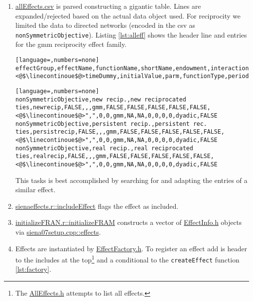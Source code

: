 \documentclass{tufte-handout}
\makeatletter
\newenvironment{listing*}[1][htbp]%
  {\ifvmode\else\unskip\fi\begin{@tufte@float}[#1]{lstlisting}{star}}
  {\end{@tufte@float}}
\def\linkstyle{} %
\newcommand\sourcelinkpF[2]{\href{../#1/#2}{\linkstyle{#2}}}
\newcommand\sourcelinkpFF[3]{\href{../#1/#2}{\linkstyle{#2::}{#3}}}
\makeatother
\begin{document}
\def\linecontinoue{\textcolor{red}{\ensuremath{\hookrightarrow}}}
\begin{enumerate}
\item \sourcelinkpF{data}{allEffects.csv} is parsed constructing a gigantic table.
Lines are expanded/rejected based on the actual data object used.
For reciprocity we limited the data to directed networks (encoded in the csv as \texttt{nonSymmetricObjective}).
Listing \ref{lst:alleff} shows the header line and entries for the gmm reciprocity effect family.
\begin{listing*}
\label{lst:alleff}
\caption{
  \texttt{allEffects.csv}: Each line (\linecontinoue continoues a line) is one effect definition for a data scenario.
}
\begin{lstlisting}[language=,numbers=none]
effectGroup,effectName,functionName,shortName,endowment,interaction1,interaction2,type,basicRate,include,randomEffects,fix,test,
<@$\linecontinoue$@>timeDummy,initialValue,parm,functionType,period,rateType,untrimmedValue,effect1,effect2,effect3,interactionType,local
\end{lstlisting}
\begin{lstlisting}[language=,numbers=none]
nonSymmetricObjective,new recip.,new reciprocated ties,newrecip,FALSE,,,gmm,FALSE,FALSE,FALSE,FALSE,FALSE,
<@$\linecontinoue$@>",",0,0,gmm,NA,NA,0,0,0,0,dyadic,FALSE
nonSymmetricObjective,persistent recip.,persistent rec. ties,persistrecip,FALSE,,,gmm,FALSE,FALSE,FALSE,FALSE,FALSE,
<@$\linecontinoue$@>",",0,0,gmm,NA,NA,0,0,0,0,dyadic,FALSE
nonSymmetricObjective,real recip.,real reciprocated ties,realrecip,FALSE,,,gmm,FALSE,FALSE,FALSE,FALSE,FALSE,
<@$\linecontinoue$@>",",0,0,gmm,NA,NA,0,0,0,0,dyadic,FALSE
\end{lstlisting}
\end{listing*}

This tasks is best accomplished by searching for and adapting the entries of a similar effect.

\item \sourcelinkpFF{R}{sienaeffects.r}{includeEffect} flags the effect as included.

\item \sourcelinkpFF{R}{initializeFRAN.r}{initializeFRAM} constructs a vector of \sourcelinkpF{src/model}{EffectInfo.h} objects via \sourcelinkpFF{src}{siena07setup.cpp}{effects}.

\item Effects are instantiated by \sourcelinkpF{src/model/effects}{EffectFactory.h}.
To register an effect add is header to the includes at the top\footnote{
  The \sourcelinkpF{src/model/effects}{AllEffects.h} attempts to list all effects.
} and a conditional to the \texttt{createEffect} function \ref{lst:factory}.


\end{enumerate}
\end{document}
